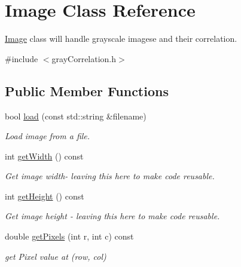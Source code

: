 \hypertarget{classImage}{}\section{Image Class Reference}
\label{classImage}


\mbox{\hyperlink{classImage}{Image}} class will handle grayscale imagese and their correlation.  




{\ttfamily \#include $<$gray\+Correlation.\+h$>$}

\subsection*{Public Member Functions}
\begin{DoxyCompactItemize}
\item 
bool \mbox{\hyperlink{classImage_ad5557cdd4e3ff3da5fd01e35f965a006}{load}} (const std\+::string \&filename)
\begin{DoxyCompactList}\small\item\em Load image from a file. \end{DoxyCompactList}\item 
\mbox{\label{classImage_a36bcae4838228d574738249a87dc4464}} 
int \mbox{\hyperlink{classImage_a36bcae4838228d574738249a87dc4464}{get\+Width}} () const
\begin{DoxyCompactList}\small\item\em Get image width-\/ leaving this here to make code reusable. \end{DoxyCompactList}\item 
\mbox{\label{classImage_a1cd7587f88b6932b5269051d1ba08ff9}} 
int \mbox{\hyperlink{classImage_a1cd7587f88b6932b5269051d1ba08ff9}{get\+Height}} () const
\begin{DoxyCompactList}\small\item\em Get image height -\/ leaving this here to make code reusable. \end{DoxyCompactList}\item 
\mbox{\label{classImage_a59f46f04057fffc2d8e18b691d7cde21}} 
double \mbox{\hyperlink{classImage_a59f46f04057fffc2d8e18b691d7cde21}{get\+Pixels}} (int r, int c) const
\begin{DoxyCompactList}\small\item\em get Pixel value at (row, col) \end{DoxyCompactList}\item 

\end{DoxyCompactItemize}

